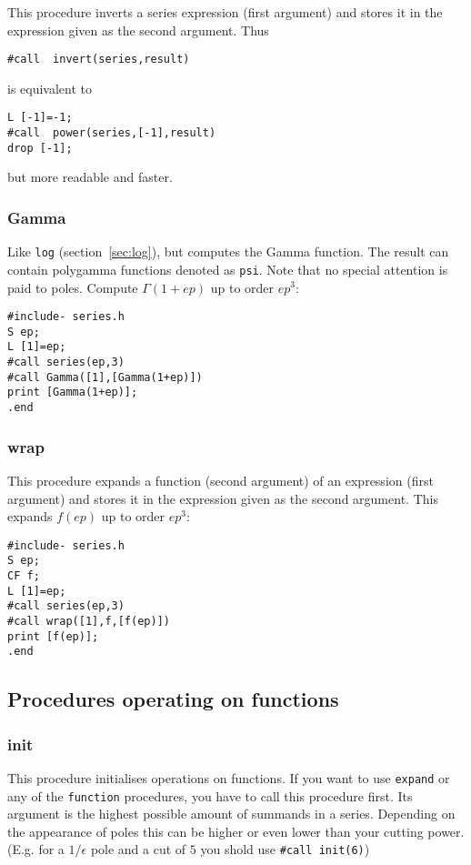 \documentclass{article}
\begin{document}
This procedure inverts a series expression (first argument) and stores
it in the expression given as the second argument. Thus
\begin{verbatim}
#call  invert(series,result)
\end{verbatim}
is equivalent to
\begin{verbatim}
L [-1]=-1;
#call  power(series,[-1],result)
drop [-1];
\end{verbatim}
but more readable and faster.

\subsubsection{Gamma}
\label{sec:gamma}

Like {\tt log} (section~\ref{sec:log}), but computes the
Gamma function. The result can contain polygamma functions denoted as
{\tt psi}. Note that no special attention is paid to poles.
Compute $\Gamma(1+ep)$ up to order $ep^3$:
\begin{verbatim}
#include- series.h
S ep;
L [1]=ep;
#call series(ep,3)
#call Gamma([1],[Gamma(1+ep)])
print [Gamma(1+ep)];
.end
\end{verbatim} 


\subsubsection{wrap}
\label{sec:wrap}

This procedure expands a function (second argument) of an expression
(first argument)
and stores it in the expression given as the second argument.
This expands $f(ep)$ up to order $ep^3$:
\begin{verbatim}
#include- series.h
S ep;
CF f;
L [1]=ep;
#call series(ep,3)
#call wrap([1],f,[f(ep)])
print [f(ep)];
.end
\end{verbatim}

\subsection{Procedures operating on functions}
\label{sec:proc_fun}

\subsubsection{init}
\label{sec:invert}

This procedure initialises operations on functions. If you want to use
{\tt expand} or any of the {\tt *function} procedures, you have to call
this procedure first. Its argument is the highest possible amount of
summands in a series. Depending on the appearance of poles this can be
higher or even lower than your cutting power. (E.g. for a $1/\epsilon$
pole and a cut of $5$ you shold use {\tt \#call init(6)})
\end{document}
